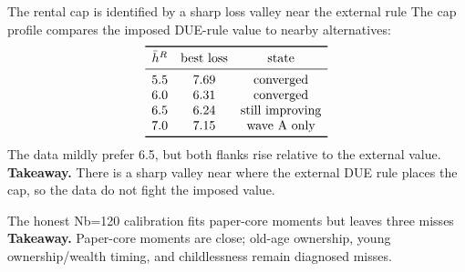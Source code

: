 \documentclass[aspectratio=169,10pt]{beamer}
\newcommand{\takeaway}[1]{\vfill{\footnotesize\textbf{Takeaway.} #1}}
\begin{document}
\begin{frame}{The rental cap is identified by a sharp loss valley near the external rule}
  The cap profile compares the imposed DUE-rule value to nearby alternatives:
  \[
  \begin{array}{ccc}
  \toprule
  \bar h^R & \text{best loss} & \text{state}\\
  \midrule
  5.5 & 7.69 & \text{converged}\\
  6.0 & 6.31 & \text{converged}\\
  6.5 & 6.24 & \text{still improving}\\
  7.0 & 7.15 & \text{wave A only}\\
  \bottomrule
  \end{array}
  \]
  The data mildly prefer 6.5, but both flanks rise relative to the external value.
  \takeaway{There is a sharp valley near where the external DUE rule places the cap, so the data do not fight the imposed value.}
\end{frame}

\begin{frame}{The honest Nb=120 calibration fits paper-core moments but leaves three misses}
  \centering
  \begingroup
  \tiny
  \renewcommand{\arraystretch}{0.86}
  \endgroup
  \takeaway{Paper-core moments are close; old-age ownership, young ownership/wealth timing, and childlessness remain diagnosed misses.}
\end{frame}
\end{document}

